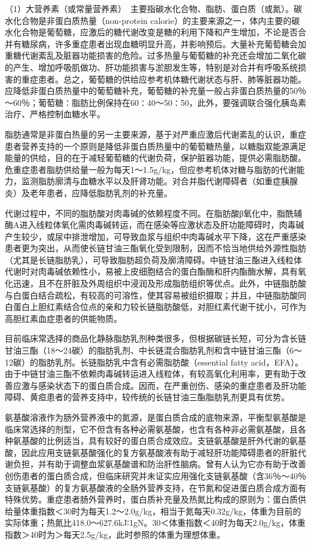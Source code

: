 （1）大营养素（或常量营养素）　主要指碳水化合物、脂肪、蛋白质（或氮）。碳水化合物是非蛋白质热量（non-protein
calorie）的主要来源之一，体内主要的碳水化合物是葡萄糖，应激后的糖代谢改变是糖的利用下降和产生增加，不论是否合并有糖尿病，许多重症患者出现血糖明显升高，并影响预后。大量补充葡萄糖会加重糖代谢紊乱及脏器功能损害的危险。过多热量与葡萄糖的补充还会增加二氧化碳的产生、增加呼吸肌做功、肝功能损害与淤胆发生等，特别是对合并有呼吸系统损害的重症患者。总之，葡萄糖的供给应参考机体糖代谢状态与肝、肺等脏器功能。应降低非蛋白质热量中的葡萄糖补充，葡萄糖的补充量一般占非蛋白质热量的50％～60％；葡萄糖∶脂肪比例保持在60∶40～50∶50，此外，要强调联合强化胰岛素治疗、严格控制血糖水平。

脂肪通常是非蛋白热量的另一主要来源，基于对严重应激后代谢紊乱的认识，重症患者营养支持的一个原则是降低非蛋白质热量中的葡萄糖热量，以糖脂双能源满足能量的供给，目的在于减轻葡萄糖的代谢负荷，保护脏器功能，提供必需脂肪酸。危重症患者脂肪供给量一般为每天1～1.5g/kg，但应参考机体对糖与脂肪的代谢能力，监测脂肪廓清与血糖水平以及肝肾功能。对合并脂代谢障碍者（如重症胰腺炎）及老年患者，应降低脂肪乳剂的补充量。

代谢过程中，不同的脂肪酸对肉毒碱的依赖程度不同。在脂肪酸β氧化中，脂酰辅酶A进入线粒体氧化需肉毒碱转运，而在感染等应激状态及肝功能障碍时，肉毒碱产生较少，或尿中排泄增加，可导致血浆与组织中肉毒碱水平下降，这在严重感染患者更为突出，从而使长链甘油三酯氧化受到限制，因而不恰当地供给外源性脂肪（尤其是长链脂肪乳），可导致脂肪超负荷及廓清障碍。中链甘油三酯进入线粒体代谢时对肉毒碱依赖性小，易被上皮细胞结合的蛋白酯酶和肝内酯酶水解，具有氧化迅速，且不在肝脏及外周组织中浸润及形成脂肪组织等优点。此外，中链脂肪酸与白蛋白结合疏松，有较高的可溶性，使其容易被组织摄取；并且，中链脂肪酸同白蛋白上胆红素结合位点的亲和力较长链脂肪酸低，对胆红素代谢干扰小，可作为高胆红素血症患者的供能物质。

目前临床常选择的商品化静脉脂肪乳剂种类很多，但根据碳链长短，可分为含长链甘油三酯（18～24碳）的脂肪乳剂、中长链混合脂肪乳剂和含中链甘油三酯（6～12碳）的脂肪乳剂。长链脂肪乳中含有必需脂肪酸（essential
fatty
acid，EFA）。由于中链甘油三酯不依赖肉毒碱转运进入线粒体，有较高氧化利用率，更有助于改善应激与感染状态下的蛋白质合成。因而，在严重创伤、感染的重症患者及肝功能障碍、黄疸患者的营养支持中，较传统的长链甘油三酯脂肪乳剂更具有优势。

氨基酸溶液作为肠外营养液中的氮源，是蛋白质合成的底物来源，平衡型氨基酸是临床常选择的剂型，它不但含有各种必需氨基酸，也含有各种非必需氨基酸，且各种氨基酸的比例适当，具有较好的蛋白质合成效应。支链氨基酸是肝外代谢的氨基酸，因此应用支链氨基酸强化的复方氨基酸液有助于减轻肝功能障碍患者的肝脏代谢负担，并有助于调整血浆氨基酸谱和防治肝性脑病。曾有人认为它亦有助于改善创伤患者的蛋白质合成，但临床研究并未证实应用强化支链氨基酸（含36％～40％支链氨基酸）的复方氨基酸液的全肠外营养支持，在节氮和促进蛋白质合成方面有特殊优势。重症患者肠外营养时，蛋白质补充量及热氮比构成的原则为：蛋白质供给量体重指数＜30时为每天1.2～2.0g/kg，相当于氮每天0.32g/kg，体重为目前的实际体重；热氮比418.0～627.6kJ∶1gN。30＜体重指数＜40时为每天2.0g/kg，体重指数＞40时为＞每天2.5g/kg，此时参照的体重为理想体重。

